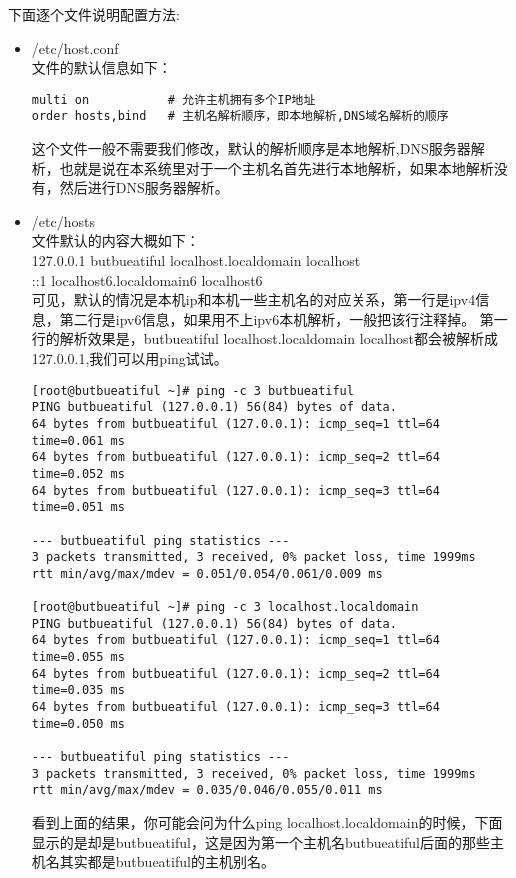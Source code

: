 下面逐个文件说明配置方法:
\begin{itemize}
\item{/etc/host.conf}\\
文件的默认信息如下：\\ 
\begin{verbatim}
multi on           # 允许主机拥有多个IP地址
order hosts,bind   # 主机名解析顺序，即本地解析,DNS域名解析的顺序
\end{verbatim}
这个文件一般不需要我们修改，默认的解析顺序是本地解析,DNS服务器解析，也就是说在本系统里对于一个主机名首先进行本地解析，如果本地解析没有，然后进行DNS服务器解析。

\item{/etc/hosts}\\
文件默认的内容大概如下：\\
127.0.0.1   butbueatiful  localhost.localdomain  localhost\\
::1         localhost6.localdomain6 localhost6\\
可见，默认的情况是本机ip和本机一些主机名的对应关系，第一行是ipv4信息，第二行是ipv6信息，如果用不上ipv6本机解析，一般把该行注释掉。
第一行的解析效果是，butbueatiful localhost.localdomain localhost都会被解析成127.0.0.1,我们可以用ping试试。
\begin{verbatim}
[root@butbueatiful ~]# ping -c 3 butbueatiful
PING butbueatiful (127.0.0.1) 56(84) bytes of data.
64 bytes from butbueatiful (127.0.0.1): icmp_seq=1 ttl=64 time=0.061 ms
64 bytes from butbueatiful (127.0.0.1): icmp_seq=2 ttl=64 time=0.052 ms
64 bytes from butbueatiful (127.0.0.1): icmp_seq=3 ttl=64 time=0.051 ms

--- butbueatiful ping statistics ---
3 packets transmitted, 3 received, 0% packet loss, time 1999ms
rtt min/avg/max/mdev = 0.051/0.054/0.061/0.009 ms

[root@butbueatiful ~]# ping -c 3 localhost.localdomain
PING butbueatiful (127.0.0.1) 56(84) bytes of data.
64 bytes from butbueatiful (127.0.0.1): icmp_seq=1 ttl=64 time=0.055 ms
64 bytes from butbueatiful (127.0.0.1): icmp_seq=2 ttl=64 time=0.035 ms
64 bytes from butbueatiful (127.0.0.1): icmp_seq=3 ttl=64 time=0.050 ms

--- butbueatiful ping statistics ---
3 packets transmitted, 3 received, 0% packet loss, time 1999ms
rtt min/avg/max/mdev = 0.035/0.046/0.055/0.011 ms
\end{verbatim}
看到上面的结果，你可能会问为什么ping localhost.localdomain的时候，下面显示的是却是butbueatiful，这是因为第一个主机名butbueatiful后面的那些主机名其实都是butbueatiful的主机别名。



\end{itemize}
